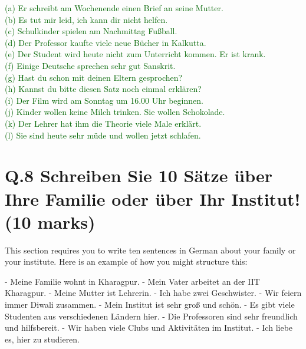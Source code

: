 \documentclass[a4paper,12pt]{article}
\begin{document}
\textcolor{darkgreen}{(a) Er schreibt am Wochenende einen Brief an seine Mutter.}\\
\textcolor{darkgreen}{(b) Es tut mir leid, ich kann dir nicht helfen.}\\
\textcolor{darkgreen}{(c) Schulkinder spielen am Nachmittag Fußball.}\\
\textcolor{darkgreen}{(d) Der Professor kaufte viele neue Bücher in Kalkutta.}\\
\textcolor{darkgreen}{(e) Der Student wird heute nicht zum Unterricht kommen. Er ist krank.}\\
\textcolor{darkgreen}{(f) Einige Deutsche sprechen sehr gut Sanskrit.}\\
\textcolor{darkgreen}{(g) Hast du schon mit deinen Eltern gesprochen?}\\
\textcolor{darkgreen}{(h) Kannst du bitte diesen Satz noch einmal erklären?}\\
\textcolor{darkgreen}{(i) Der Film wird am Sonntag um 16.00 Uhr beginnen.}\\
\textcolor{darkgreen}{(j) Kinder wollen keine Milch trinken. Sie wollen Schokolade.}\\
\textcolor{darkgreen}{(k) Der Lehrer hat ihm die Theorie viele Male erklärt.}\\
\textcolor{darkgreen}{(l) Sie sind heute sehr müde und wollen jetzt schlafen.}\\


\vspace{1cm}

\section*{Q.8 Schreiben Sie 10 Sätze über Ihre Familie oder über Ihr Institut! (10 marks)}

This section requires you to write ten sentences in German about your family or your institute. Here is an example of how you might structure this:

- Meine Familie wohnt in Kharagpur.
- Mein Vater arbeitet an der IIT Kharagpur.
- Meine Mutter ist Lehrerin.
- Ich habe zwei Geschwister.
- Wir feiern immer Diwali zusammen.
- Mein Institut ist sehr groß und schön.
- Es gibt viele Studenten aus verschiedenen Ländern hier.
- Die Professoren sind sehr freundlich und hilfsbereit.
- Wir haben viele Clubs und Aktivitäten im Institut.
- Ich liebe es, hier zu studieren.
\end{document}
